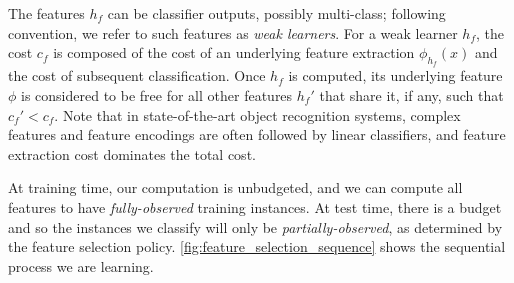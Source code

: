 The features $h_f$ can be classifier outputs, possibly multi-class; following convention, we refer to such features as \emph{weak learners}.
For a weak learner $h_f$, the cost $c_f$ is composed of the cost of an underlying feature extraction $\phi_{h_f}(x)$ and the cost of subsequent classification.
Once $h_f$ is computed, its underlying feature $\phi$ is considered to be free for all other features $h_f'$ that share it, if any, such that $c_f' < c_f$.
Note that in state-of-the-art object recognition systems, complex features and feature encodings are often followed by linear classifiers, and feature extraction cost dominates the total cost.



At training time, our computation is unbudgeted, and we can compute all features to have \emph{fully-observed} training instances.
At test time, there is a budget and so the instances we classify will only be \emph{partially-observed}, as determined by the feature selection policy.
\autoref{fig:feature_selection_sequence} shows the sequential process we are learning.
